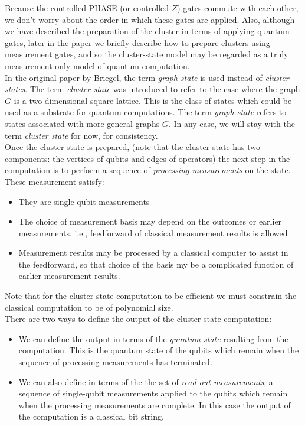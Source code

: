 \documentclass{book}
\theoremstyle{definition}
\begin{document}
Because the controlled-PHASE (or controlled-$Z$) gates commute with each other, we don't worry about the order in which these gates are applied. Also, although we have described the preparation of the cluster in terms of applying quantum gates, later in the paper we briefly describe how to prepare clusters using measurement gates, and so the cluster-state model may be regarded as a truly measurement-only model of quantum computation. \\

In the original paper by Briegel, the term \textit{graph state} is used instead of \textit{cluster states}. The term \textit{cluster state} was introduced to refer to the case where the graph $G$ is a two-dimensional square lattice. This is the class of states which could be used as a substrate for quantum computations. The term \textit{graph state} refers to states associated with more general graphs $G$. In any case, we will stay with the term \textit{cluster state} for now, for consistency. \\


Once the cluster state is prepared, (note that the cluster state has two components: the vertices of qubits and edges of operators) the next step in the computation is to perform a sequence of \textit{processing measurements} on the state. These measurement satisfy:
\begin{itemize}
	\item They are single-qubit measurements
	\item The choice of measurement basis may depend on the outcomes or earlier measurements, i.e., feedforward of classical measurement results is allowed
	\item Measurement results may be processed by a classical computer to assist in the feedforward, so that choice of the basis my be a complicated function of earlier measurement results. 
\end{itemize}

Note that for the cluster state computation to be efficient we must constrain the classical computation to be of polynomial size. \\


There are two ways to define the output of the cluster-state computation:
\begin{itemize}
	\item We can define the output in terms of the \textit{quantum state} resulting from the computation. This is the quantum state of the qubits which remain when the sequence of processing measurements has terminated. 
	
	\item We can also define in terms of the the set of \textit{read-out measurements}, a sequence of single-qubit measurements applied to the qubits which remain when the processing measurements are complete. In this case the output of the computation is a classical bit string. 
\end{itemize}
\end{document}
